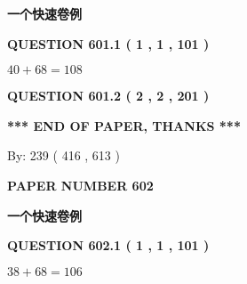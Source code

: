 \documentclass{ctexart}
\begin{document}
   
   
   
   
   
 \vspace{0.2in}
{\LARGE {\textbf{ 一个快速卷例}}}
   
   
  
\vspace{0.2in}
  
{\textbf{\Large{QUESTION
601.1 
 ( 1 , 1 , 101 )
}}}
  
  
 
 

$ %
40 +  %
68=   %
108$
 
 
  
\vspace{0.2in}
  
{\textbf{\Large{QUESTION
601.2 
 ( 2 , 2 , 201 )
}}}
  
  
   
   
 \vspace{0.2in}
 
   
   
   
   
\vspace{1.0in} 
{\textbf{\large{ *** END OF PAPER, THANKS *** }}} 
   
   
\hspace{1.0in} By: 
 239 ( 416 ,  613 )
   
   
   
   
\newpage 
\setcounter{page}{ 
   602001 } 
   
   
   
   
 {\textbf{ \Large{ PAPER NUMBER  602  }}}
   
   
\vspace{0.2in}
   
   
   
   
   
   
 \vspace{0.2in}
{\LARGE {\textbf{ 一个快速卷例}}}
   
   
  
\vspace{0.2in}
  
{\textbf{\Large{QUESTION
602.1 
 ( 1 , 1 , 101 )
}}}
  
  
 
 

$ %
38 +  %
68=   %
106$
 
\end{document}
